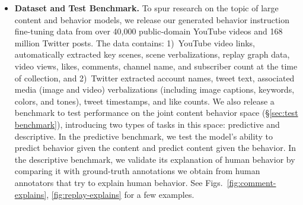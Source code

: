 \begin{itemize}[leftmargin=*]
    \item\textbf{Dataset and Test Benchmark.} To spur research on the topic of large content and behavior models, we release our generated behavior instruction fine-tuning data from over 40,000 public-domain YouTube videos and 168 million Twitter posts. The data contains: 1)~YouTube video links, automatically extracted key scenes, scene verbalizations, replay graph data, video views, likes, comments, channel name, and subscriber count at the time of collection, and 2)~Twitter extracted account names, tweet text, associated media (image and video) verbalizations (including image captions, keywords, colors, and tones), tweet timestamps, and like counts. We also release a benchmark to test performance on the joint content behavior space (\S\ref{sec:test benchmark}), introducing two types of tasks in this space: predictive and descriptive. In the predictive benchmark, we test the model's ability to predict behavior given the content and predict content given the behavior. In the descriptive benchmark, we validate its explanation of human behavior by comparing it with ground-truth annotations we obtain from human annotators that try to explain human behavior. See Figs.~\ref{fig:comment-explains}, \ref{fig:replay-explains} for a few examples.
\end{itemize}










